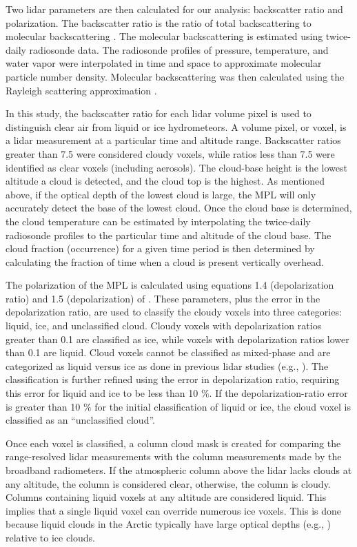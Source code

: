 Two lidar parameters are then calculated for our analysis: backscatter ratio and polarization. The backscatter ratio is the ratio of total backscattering to molecular backscattering \citep{klett:1981}. The molecular backscattering is estimated using twice-daily radiosonde data. The radiosonde profiles of pressure, temperature, and water vapor were interpolated in time and space to approximate molecular particle number density. Molecular backscattering was then calculated using the Rayleigh scattering approximation \citep{bohren:2006, bohren:2008, placzek:1934}. 

In this study, the backscatter ratio for each lidar volume pixel is used to distinguish clear air from liquid or ice hydrometeors. A volume pixel, or voxel, is a lidar measurement at a particular time and altitude range. Backscatter ratios greater than 7.5 were considered cloudy voxels, while ratios less than 7.5 were identified as clear voxels (including aerosols). The cloud-base height is the lowest altitude a cloud is detected, and the cloud top is the highest. As mentioned above, if the optical depth of the lowest cloud is large, the MPL will only accurately detect the base of the lowest cloud. Once the cloud base is determined, the cloud temperature can be estimated by interpolating the twice-daily radiosonde profiles to the particular time and altitude of the cloud base. The cloud fraction (occurrence) for a given time period is then determined by calculating the fraction of time when a cloud is present vertically overhead.

The polarization of the MPL is calculated using equations 1.4 (depolarization ratio) and 1.5 (depolarization) of \citet{flynn:2007}. These parameters, plus the error in the depolarization ratio, are used to classify the cloudy voxels into three categories: liquid, ice, and unclassified cloud. Cloudy voxels with depolarization ratios greater than 0.1 are classified as ice, while voxels with depolarization ratios lower than 0.1 are liquid. Cloud voxels cannot be classified as mixed-phase and are categorized as liquid versus ice as done in previous lidar studies (e.g., \citet{intrieri:2002}). The classification is further refined using the error in depolarization ratio, requiring this error for liquid and ice to be less than 10 $\%$. If the depolarization-ratio error is greater than 10 $\%$ for the initial classification of liquid or ice, the cloud voxel is classified as an “unclassified cloud”. 

Once each voxel is classified, a column cloud mask is created for comparing the range-resolved lidar measurements with the column measurements made by the broadband radiometers. If the atmospheric column above the lidar lacks clouds at any altitude, the column is considered clear, otherwise, the column is cloudy. Columns containing liquid voxels at any altitude are considered liquid. This implies that a single liquid voxel can override numerous ice voxels. This is done because liquid clouds in the Arctic typically have large optical depths (e.g., \citet{curry:1996}) relative to ice clouds.

